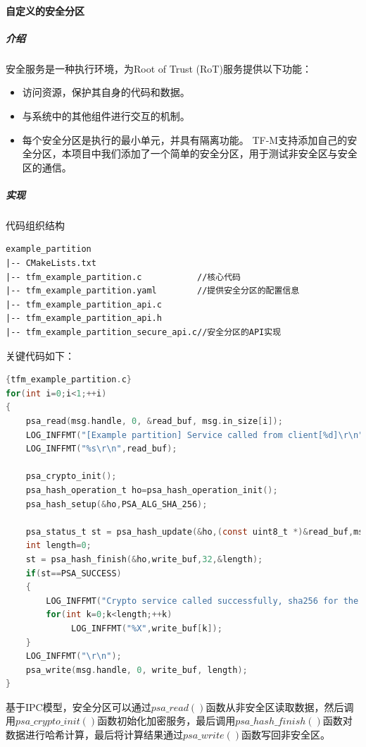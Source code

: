 \documentclass[12pt,a4paper]{ctexart}
\numberwithin{figure}{section}
\begin{document}
\paragraph{自定义的安全分区}
\subparagraph{介绍}
安全服务是一种执行环境，为Root of Trust (RoT)服务提供以下功能：
\begin{itemize}
    \item 访问资源，保护其自身的代码和数据。
    \item 与系统中的其他组件进行交互的机制。
    \item 每个安全分区是执行的最小单元，并具有隔离功能。 TF-M支持添加自己的安全分区，本项目中我们添加了一个简单的安全分区，用于测试非安全区与安全区的通信。

\end{itemize}
\subparagraph{实现}
\par 代码组织结构
\begin{lstlisting}
example_partition
|-- CMakeLists.txt
|-- tfm_example_partition.c           //核心代码
|-- tfm_example_partition.yaml        //提供安全分区的配置信息
|-- tfm_example_partition_api.c         
|-- tfm_example_partition_api.h         
|-- tfm_example_partition_secure_api.c//安全分区的API实现

\end{lstlisting}
\par 关键代码如下：
\begin{lstlisting}[language=C]{tfm_example_partition.c}
for(int i=0;i<1;++i)
{
    psa_read(msg.handle, 0, &read_buf, msg.in_size[i]);
    LOG_INFFMT("[Example partition] Service called from client[%d]\r\n",msg.client_id);
    LOG_INFFMT("%s\r\n",read_buf);
            
    psa_crypto_init();
    psa_hash_operation_t ho=psa_hash_operation_init();
    psa_hash_setup(&ho,PSA_ALG_SHA_256);
            
    psa_status_t st = psa_hash_update(&ho,(const uint8_t *)&read_buf,msg.in_size[i]-1);
    int length=0;
    st = psa_hash_finish(&ho,write_buf,32,&length);
    if(st==PSA_SUCCESS)
    {
        LOG_INFFMT("Crypto service called successfully, sha256 for the string is:\r\n");
        for(int k=0;k<length;++k)
             LOG_INFFMT("%X",write_buf[k]);
    }
    LOG_INFFMT("\r\n");
	psa_write(msg.handle, 0, write_buf, length);
}
\end{lstlisting}
\par 基于IPC模型，安全分区可以通过$psa\_read()$函数从非安全区读取数据，然后调用$psa\_crypto\_init()$函数初始化加密服务，最后调用$psa\_hash\_finish()$函数对数据进行哈希计算，最后将计算结果通过$psa\_write()$函数写回非安全区。
\end{document}
